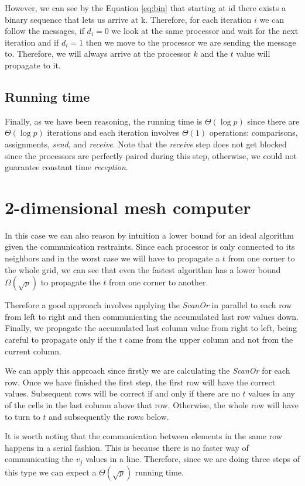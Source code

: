 \documentclass[a4paper]{article}
\begin{document}
    However, we can see by the Equation \ref{eq:bin} that starting at id there exists a binary sequence that lets us arrive at k. Therefore, for each iteration $i$ we can follow the messages, if $d_i = 0$ we look at the same processor and wait for the next iteration and if $d_i = 1$ then we move to the processor we are sending the message to. Therefore, we will always arrive at the processor $k$ and the $t$ value will propagate to it. \qedsymbol

    \subsection{Running time}
    Finally, as we have been reasoning, the running time is $\Theta(\log p)$ since there are $\Theta(\log p)$ iterations and each iteration involves $\Theta(1)$ operations: comparisons, assignments, \emph{send}, and \emph{receive}. Note that the \emph{receive} step does not get blocked since the processors are perfectly paired during this step, otherwise, we could not guarantee constant time \emph{reception}.
\newpage
\section{2-dimensional mesh computer}
    In this case we can also reason by intuition a lower bound for an ideal algorithm given the communication restraints. Since each processor is only connected to its neighbors and in the worst case we will have to propagate a $t$ from one corner to the whole grid, we can see that even the fastest algorithm has a lower bound $\Omega(\sqrt{p})$ to propagate the $t$ from one corner to another.

    Therefore a good approach involves applying the \emph{ScanOr} in parallel to each row from left to right and then communicating the accumulated last row values down. Finally, we propagate the accumulated last column value from right to left, being careful to propagate only if the $t$ came from the upper column and not from the current column.

    We can apply this approach since firstly we are calculating the \emph{ScanOr} for each row. Once we have finished the first step, the first row will have the correct values. Subsequent rows will be correct if and only if there are no $t$ values in any of the cells in the last column above that row. Otherwise, the whole row will have to turn to $t$ and subsequently the rows below.

    It is worth noting that the communication between elements in the same row happens in a serial fashion. This is because there is no faster way of communicating the $v_j$ values in a line. Therefore, since we are doing three steps of this type we can expect a $\Theta(\sqrt{p})$ running time.
\end{document}
